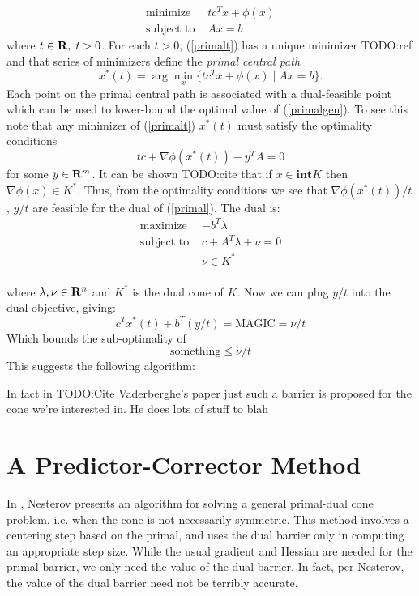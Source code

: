 \documentclass{article}
\begin{document}
\begin{equation}\label{primalt}
  \begin{array}{ll}
    \mbox{minimize}    & tc^Tx + \phi(x)\\
    \mbox{subject to } & Ax = b
  \end{array}
\end{equation}
where $t \in \mathbf{R},\;t >0$. For each $t >0$, (\ref{primalt}) has a unique minimizer TODO:ref
and that series of minimizers define the \emph{primal central path}
\[
  x^*(t) = \arg\min_x\{tc^Tx + \phi(x) \mid Ax=b\}.
\]
Each point on the primal central path is associated with a dual-feasible point which
can be used to lower-bound the optimal value of (\ref{primalgen}). To see this note that
any minimizer of (\ref{primalt}) $x^*(t)$ must satisfy the optimality conditions
\[
  tc + \nabla\phi(x^*(t)) - y^TA = 0
\]
for some $y\in\mathbf{R}^m$. It can be shown TODO:cite that if  $x \in \mathbf{int} K$ then
$\nabla\phi(x) \in K^*$. Thus, from the optimality conditions we 
see that $\nabla\phi(x^*(t))/t$, $y/t$ are feasible for the dual of (\ref{primal}). 
The dual is:
\begin{equation}\label{dual}
  \begin{array}{ll}
    \mbox{maximize}    & -b^T\lambda \\
    \mbox{subject to } & c + A^T\lambda + \nu = 0 \\
                       & \nu \in K^* \\
  \end{array}
\end{equation}

where $\lambda, \nu \in \mathbf{R}^n$ and $K^*$ is the dual cone of $K$. Now we can plug 
$y/t$ into the dual objective, giving:
\[
  c^Tx^*(t) + b^T(y/t) =   \text{MAGIC} = \nu/t
\]
Which bounds the sub-optimality of 
\[
  \text{something} \leq \nu/t 
\]
This suggests the following algorithm:


In fact in TODO:Cite Vaderberghe's paper just such a barrier is proposed for the cone we're
interested in. He does lots of stuff to blah 

\section{A Predictor-Corrector Method}
In , Nesterov presents an algorithm for solving a general
primal-dual cone problem, i.e. when the cone is not necessarily symmetric. This
method involves a centering step based on the primal, and uses the dual barrier
only in computing an appropriate step size. While the usual gradient and
Hessian are needed for the primal barrier, we only need the value of the dual
barrier. In fact, per Nesterov, the value of the dual barrier need not be terribly accurate.
\end{document}
